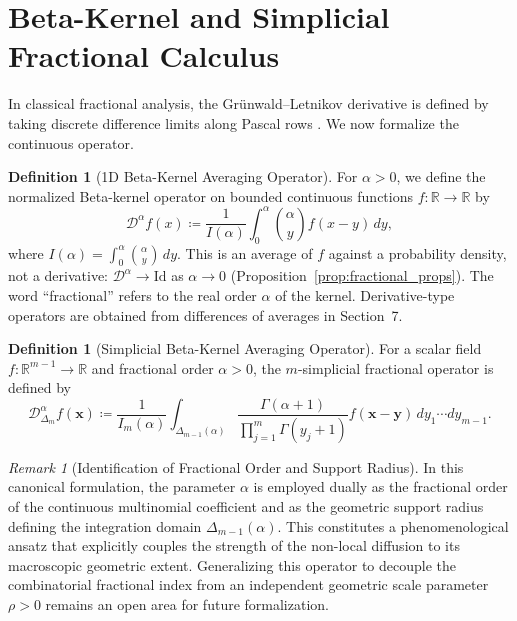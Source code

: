 \documentclass[11pt,a4paper]{article}
\theoremstyle{plain}
\theoremstyle{definition}
\newtheorem{definition}[theorem]{Definition}
\theoremstyle{remark}
\newtheorem{remark}[theorem]{Remark}
\numberwithin{equation}{section}
\providecommand{\Id}{\mathrm{Id}}
\begin{document}
\section{Beta-Kernel and Simplicial Fractional Calculus}

In classical fractional analysis, the Grünwald--Letnikov derivative is defined by taking discrete difference limits along Pascal rows \cite{podlubny1998, samko1993}. We now formalize the continuous operator.

\begin{definition}[1D Beta-Kernel Averaging Operator]
For $\alpha > 0$, we define the normalized Beta-kernel operator on bounded continuous functions $f \colon \mathbb{R} \to \mathbb{R}$ by
\begin{equation}
\mathcal{D}^\alpha f(x) \coloneqq \frac{1}{I(\alpha)}\int_0^\alpha \binom{\alpha}{y} f(x - y)\,dy,
\end{equation}
where $I(\alpha) = \int_0^\alpha \binom{\alpha}{y}\,dy$. This is an average of $f$ against a probability density, not a derivative: $\mathcal{D}^\alpha \to \Id$ as $\alpha \to 0$ (Proposition~\ref{prop:fractional_props}). The word ``fractional'' refers to the real order $\alpha$ of the kernel. Derivative-type operators are obtained from differences of averages in Section~7.
\end{definition}

\begin{definition}[Simplicial Beta-Kernel Averaging Operator]
For a scalar field $f: \mathbb{R}^{m-1} \to \mathbb{R}$ and fractional order $\alpha > 0$, the $m$-simplicial fractional operator is defined by
\begin{equation}
\mathcal{D}_{\Delta_m}^\alpha f(\mathbf{x}) \coloneqq \frac{1}{I_m(\alpha)}\int_{\Delta_{m-1}(\alpha)} \frac{\Gamma(\alpha+1)}{\prod_{j=1}^m \Gamma(y_j+1)} f(\mathbf{x} - \mathbf{y})\,dy_1 \cdots dy_{m-1}.
\end{equation}
\end{definition}

\begin{remark}[Identification of Fractional Order and Support Radius]
In this canonical formulation, the parameter $\alpha$ is employed dually as the fractional order of the continuous multinomial coefficient and as the geometric support radius defining the integration domain $\Delta_{m-1}(\alpha)$. This constitutes a phenomenological ansatz that explicitly couples the strength of the non-local diffusion to its macroscopic geometric extent. Generalizing this operator to decouple the combinatorial fractional index from an independent geometric scale parameter $\rho > 0$ remains an open area for future formalization.
\end{remark}
\end{document}
